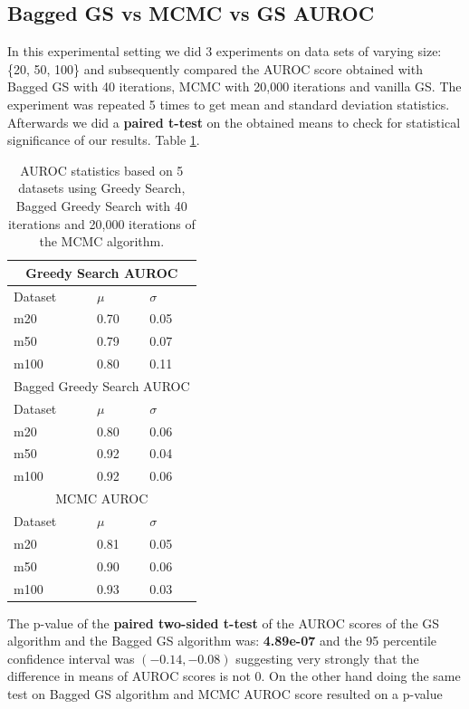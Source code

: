\documentclass{article}
\begin{document}
	\subsection{Bagged GS vs MCMC vs GS AUROC}
	In this experimental setting we did 3 experiments on data sets of varying
	size: \{20, 50, 100\} and subsequently compared the AUROC score obtained with
	Bagged GS with 40 iterations, MCMC with 20,000 iterations and vanilla GS. The
	experiment was repeated 5 times to get mean and standard deviation
	statistics. Afterwards we did a \textbf{paired t-test} on the obtained means
	to check for statistical significance of our results.
	Table \ref{tabla:iBest}.
	\begin{table}[ht]
		\centering
		\begin{tabular}{ |p{3cm}||p{3cm}|p{3cm}|}
		 \hline
		 \multicolumn{3}{|c|}{Greedy Search AUROC} \\
		 \hline
		 Dataset & $\mu$ & $\sigma$ \\
		 \hline
		 m20 & 0.70 & 0.05 \\
		 m50 & 0.79  & 0.07 \\
		 m100 & 0.80 & 0.11 \\
		 \hline
		 \multicolumn{3}{|c|}{Bagged Greedy Search AUROC} \\
		 \hline
		 Dataset & $\mu$ & $\sigma$ \\
		 \hline
		 m20 & 0.80 & 0.06 \\
		 m50 & 0.92  & 0.04 \\
		 m100 & 0.92 & 0.06 \\
		 \hline
		 \multicolumn{3}{|c|}{MCMC AUROC} \\
		 \hline
		 Dataset & $\mu$ & $\sigma$ \\
		 \hline
		 m20 & 0.81 & 0.05 \\
		 m50 & 0.90  & 0.06 \\
		 m100 & 0.93 & 0.03 \\
		 \hline
		\end{tabular}
		\caption{AUROC statistics based on 5 datasets using Greedy Search, Bagged
			Greedy Search with 40 iterations and 20,000 iterations of the MCMC algorithm.}
		\label{tabla:iBest}
	\end{table}
	The p-value of the \textbf{paired two-sided t-test} of the AUROC scores of the GS algorithm
	and the Bagged GS algorithm was: \textbf{4.89e-07} and the 95 percentile confidence
	interval was $(-0.14, -0.08)$ suggesting very strongly that the
	difference in means of AUROC scores is not 0. On the other hand doing the
	same test on Bagged GS algorithm and MCMC AUROC score resulted on a p-value
\end{document}
